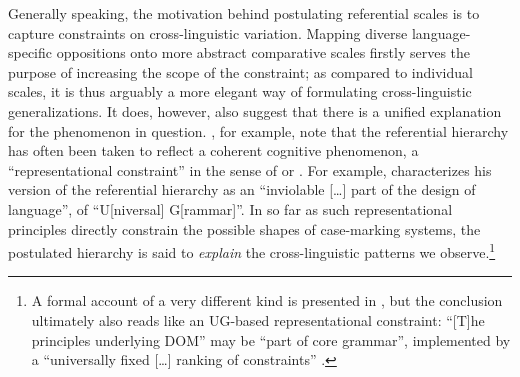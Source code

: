 \documentclass[output=paper]{langscibook}
\begin{document}
Generally speaking, the motivation behind postulating referential scales is to capture constraints on cross-linguistic variation. Mapping diverse language-specific oppositions onto more abstract comparative scales firstly serves the purpose of increasing the scope of the constraint; as compared to individual scales, it is thus arguably a more elegant way of formulating cross-linguistic generalizations. It does, however, also suggest that there is a unified explanation for the phenomenon in question. \citet{Gildeaetal2016Referential}, for example, note that the referential hierarchy has often been taken to reflect a coherent cognitive phenomenon, a “representational constraint” in the sense of \citet{Haspelmath2017Can} or \citet{Elmanetal1996Rethinking}. For example, \citet[39--40]{Kiparsky2008Universals} characterizes his version of the referential hierarchy as an “inviolable […] part of the design of language”, \ie of “U[niversal] G[rammar]”. In so far as such representational principles directly constrain the possible shapes of case-marking systems, the postulated hierarchy is said to \textit{explain} the cross-linguistic patterns we observe.\footnote{A formal account of a very different kind is presented in \citet{Aissen2003Differential}, but the conclusion ultimately also reads like an UG-based representational constraint: “[T]he principles underlying DOM” may be “part of core grammar”, implemented by a “universally fixed […] ranking of constraints” \citep[439--440]{Aissen2003Differential}.}   
\end{document}
